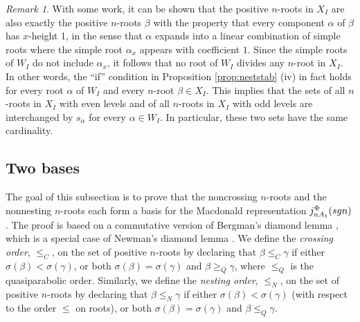 \documentclass[11pt]{amsart}
\theoremstyle{plain}
\theoremstyle{definition}
\theoremstyle{remark}
\newtheorem{rmk}[theorem]{Remark}
\numberwithin{equation}{subsection}
\newcommand{\al}{\alpha}
\newcommand{\be}{\beta}
\newcommand{\macd}[2]{j^{#1}_{#2}({\rm{sgn}})}
\begin{document}
\begin{rmk}
\label{rmk:xht}
With some work, it can be shown that the positive $n$-roots in $X_I$ are also
exactly the positive $n$-roots $\beta$ with the property that every component
$\al$ of $\beta$ has $x$-height 1, in the sense that $\al$ expands into a linear
combination of simple roots where the simple root $\al_x$ appears with
coefficient $1$. Since the simple roots of $W_I$ do not include $\al_x$, it
follows that no root of $W_I$ divides any $n$-root in $X_I$. In other words, the
``if'' condition in Proposition \ref{prop:neststab} (iv) in fact holds for every
root $\al$ of $W_I$ and every $n$-root $\beta\in X_I$.  This implies that the
sets of all $n$-roots in $X_I$ with even levels and of all $n$-roots in $X_I$
with odd levels are interchanged by $s_\al$ for every $\al\in W_I$.  In
particular, these two sets have the same cardinality.
\end{rmk}




\subsection{Two bases} 
\label{sec:twobases}
The goal of this subsection is to prove that the noncrossing $n$-roots and the
nonnesting $n$-roots each form a basis for the Macdonald representation
$\macd{\Phi}{nA_1}$.  The
proof is based on a commutative version of Bergman's diamond lemma
\cite{bergman78}, which is a special case of Newman's diamond lemma
\cite{newman42}. We define the {\it crossing order}, $\leq_C$, on the set of
positive $n$-roots by declaring that $\be \leq_C \gamma$ if either $\sigma(\be)
< \sigma(\gamma)$, or both $\sigma(\be) = \sigma(\gamma)$ and $\be \geq_Q
\gamma$, where $\leq_Q$ is the quasiparabolic order.  Similarly, we define the
{\it nesting order}, $\leq_N$, on the set of positive $n$-roots by declaring
that $\be \leq_N \gamma$ if either $\sigma(\be) < \sigma(\gamma)$ (with respect
    to the order
$\le$ on roots), or both
$\sigma(\be) = \sigma(\gamma)$ and $\be \leq_Q \gamma$.
\end{document}
